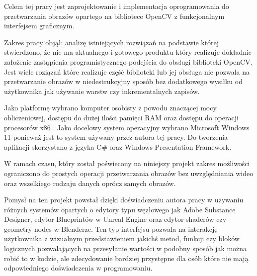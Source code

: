 Celem tej pracy jest zaprojektowanie i implementacja oprogramowania do przetwarzania obrazów opartego na bibliotece OpenCV z funkcjonalnym interfejsem graficznym.

Zakres pracy objął: analizę istniejących rozwiązań na podstawie której stwierdzono, że nie ma aktualnego i gotowego produktu który realizuje dokładnie założenie zastąpienia programistycznego podejścia do obsługi biblioteki OpenCV. 
Jest wiele roziązań które realizuje część biblioteki lub jej obsługa nie pozwala na przetwarzanie obrazów w niedestrukcyjny sposób bez dodatkowego wysiłku od użytkownika jak używanie warstw czy inkrementalnych zapisów. 

Jako platformę wybrano komputer osobisty z powodu znaczącej mocy obliczeniowej, dostępu do dużej ilości pamięci RAM oraz dostępu do operacji procesorów x86 \cite{x86opencv}. 
Jako docelowy system operacyjny wybrano Microsoft Windows 11 ponieważ jest to system używany przez autora tej pracy. 
Do tworzenia aplikacji skorzystano z języka C\# oraz Windows Presentation Framework. 

W ramach czasu, który został poświecony na niniejszy projekt zakres możliwości ograniczono do prostych operacji przetwarzania obrazów bez uwzględniania wideo oraz wszelkiego rodzaju danych oprócz samych obrazów. 

Pomysł na ten projekt powstał dzięki doświadczeniu autora pracy w używaniu różnych systemów opartych o edytory typu węzłowego jak Adobe Substance Designer, edytor Blueprintów w Unreal Engine oraz edytor shaderów czy geometry nodes w Blenderze. 
Ten typ interfejsu pozwala na interakcję użytkownika z wizualnym przedstawieniem jakichś metod, funkcji czy bloków logicznych pozwalających na przesyłanie wartości w podobny sposób jak można robić to w kodzie, ale zdecydowanie bardziej przystępne dla osób które nie mają odpowiedniego doświadczenia w programowaniu.  